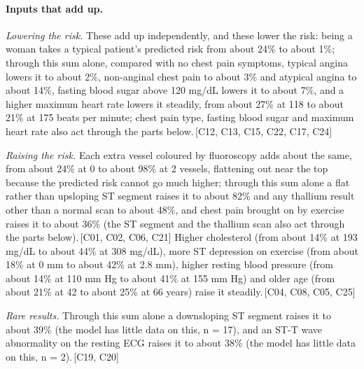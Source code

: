 \documentclass[a4paper,10pt]{article}
\newif\ifreviewmarks
\newcommand{\reviewrule}{\noindent{\color{BrickRed}\rule{\linewidth}{0.8pt}}}
\newenvironment{drafted}[1][]{%
  \ifreviewmarks\par\addvspace{\medskipamount}\reviewrule\par\nopagebreak
  \noindent{\color{BrickRed}\sffamily\footnotesize\textbf{Thesis Draft}\quad #1\hfill review}\par\nopagebreak\smallskip\fi}{%
  \ifreviewmarks\par\smallskip\noindent{\color{BrickRed}\sffamily\footnotesize end of thesis draft}\par\nopagebreak\reviewrule\par\medskip\fi}
\begin{document}
\begin{drafted}[plain-language layer: heart-s4-c1]
\paragraph{Inputs that add up.} \par\noindent\textit{Lowering the risk.}  These add up independently, and these lower the risk: being a woman takes a typical patient's predicted risk from about 24\% to about 1\%; through this sum alone, compared with no chest pain symptoms, typical angina lowers it to about 2\%, non-anginal chest pain to about 3\% and atypical angina to about 14\%, fasting blood sugar above 120 mg/dL lowers it to about 7\%, and a higher maximum heart rate lowers it steadily, from about 27\% at 118 to about 21\% at 175 beats per minute; chest pain type, fasting blood sugar and maximum heart rate also act through the parts below.\,{\scriptsize\textcolor{NavyBlue}{[C12, C13, C15, C22, C17, C24]}} \par\noindent\textit{Raising the risk.}  Each extra vessel coloured by fluoroscopy adds about the same, from about 24\% at 0 to about 98\% at 2 vessels, flattening out near the top because the predicted risk cannot go much higher; through this sum alone a flat rather than upsloping ST segment raises it to about 82\% and any thallium result other than a normal scan to about 48\%, and chest pain brought on by exercise raises it to about 36\% (the ST segment and the thallium scan also act through the parts below).\,{\scriptsize\textcolor{NavyBlue}{[C01, C02, C06, C21]}} Higher cholesterol (from about 14\% at 193 mg/dL to about 44\% at 308 mg/dL), more ST depression on exercise (from about 18\% at 0 mm to about 42\% at 2.8 mm), higher resting blood pressure (from about 14\% at 110 mm Hg to about 41\% at 155 mm Hg) and older age (from about 21\% at 42 to about 25\% at 66 years) raise it steadily.\,{\scriptsize\textcolor{NavyBlue}{[C04, C08, C05, C25]}} \par\noindent\textit{Rare results.}  Through this sum alone a downsloping ST segment raises it to about 39\% (the model has little data on this, n = 17), and an ST-T wave abnormality on the resting ECG raises it to about 38\% (the model has little data on this, n = 2).\,{\scriptsize\textcolor{NavyBlue}{[C19, C20]}}

\end{drafted}
\end{document}
